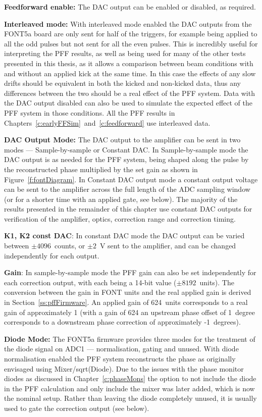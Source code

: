 \textbf{Feedforward enable:} The DAC output can be enabled or disabled, as required.

\textbf{Interleaved mode:} With interleaved mode enabled the DAC outputs from the FONT5a board are only sent for half of the triggers, for example being applied to all the odd pulses but not sent for all the even pulses. This is incredibly useful for interpreting the PFF results, as well as being used for many of the other tests presented in this thesis, as it allows a comparison between beam conditions with and without an applied kick at the same time. In this case the effects of any slow drifts should be equivalent in both the kicked and non-kicked data, thus any differences between the two should be a real effect of the PFF system. Data with the DAC output disabled can also be used to simulate the expected effect of the PFF system in those conditions. All the PFF results in Chapters~\ref{c:earlyFFSim}~and~\ref{c:feedforward} use interleaved data.

\textbf{DAC Output Mode:} The DAC output to the amplifier can be sent in two modes --- Sample-by-sample or Constant DAC. In Sample-by-sample mode the DAC output is as needed for the PFF system, being shaped along the pulse by the reconstructed phase multiplied by the set gain as shown in Figure~\ref{f:fontDiagram}. In Constant DAC output mode a constant output voltage can be sent to the amplifier across the full length of the ADC sampling window (or for a shorter time with an applied gate, see below). The majority of the results presented in the remainder of this chapter use constant DAC outputs for verification of the amplifier, optics, correction range and correction timing.

\textbf{K1, K2 const DAC}: In constant DAC mode the DAC output can be varied between \(\pm4096\)~counts, or \(\pm2\)~V sent to the amplifier, and can be changed independently for each output.

\textbf{Gain}: In sample-by-sample mode the PFF gain can also be set independently for each correction output, with each being a 14-bit value (\(\pm8192\)~units). The conversion between the gain in FONT units and the real applied gain is derived in Section~\ref{ss:pffFirmware}. An applied gain of 624~units corresponds to a real gain of approximately 1 (with a gain of 624 an upstream phase offset of 1~degree corresponds to a downstream phase correction of approximately -1~degrees).

\textbf{Diode Mode:} The FONT5a firmware provides three modes for the treatment of the diode signal on ADC1 --- normalisation, gating and unused. With diode normalisation enabled the PFF system reconstructs the phase as originally envisaged using Mixer/sqrt(Diode). Due to the issues with the phase monitor diodes as discussed in Chapter~\ref{c:phaseMons} the option to not include the diode in the PFF calculation and only include the mixer was later added, which is now the nominal setup. Rather than leaving the diode completely unused, it is usually used to gate the correction output (see below).

